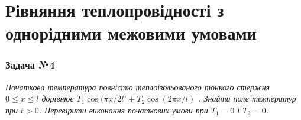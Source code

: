 \documentclass[a4paper, 14pt]{extreport}
\begin{document}
\section{Рівняння теплопровідності з однорідними межовими умовами}

\subsubsection{Задача №4}

\textit{Початкова температура повністю теплоізольованого тонкого стержня\\ $0 \leq x \leq l$ дорівнює $T_1 \cos(\pi x/2l^) + T_2 \cos(2\pi x/l)$ . Знайти поле температур при $t > 0$. Перевірити виконання початкових умови при $T_1 = 0$ і $T_2 = 0$.}
\end{document}
